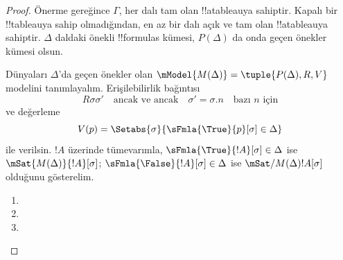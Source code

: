 \documentclass[../../../include/open-logic-section]{subfiles}
\begin{document}
\begin{proof}
Önerme gereğince $\Gamma$, her dalı tam olan !!a{tableau}{}ya sahiptir. Kapalı
bir !!{tableau}{}ya sahip olmadığından, en az bir dalı açık ve tam olan
!!a{tableau}{}ya sahiptir. $\Delta$ daldaki önekli !!{formula}s kümesi,
$P(\Delta)$ da onda geçen önekler kümesi olsun.

Dünyaları $\Delta$'da geçen önekler olan
$\mModel{M(\Delta)} = \tuple{P(\Delta), R, V}$ modelini tanımlayalım.
Erişilebilirlik bağıntısı
\[
R\sigma\sigma' \quad \text{ancak ve ancak} \quad
\sigma'=\sigma.n \quad \text{bazı $n$ için}
\]
ve değerleme
\[
V(p) = \Setabs{\sigma}{\sFmla{\True}{p}[\sigma] \in \Delta}
\]
ile verilsin. $!A$ üzerinde tümevarımla,
$\sFmla{\True}{!A}[\sigma] \in \Delta$ ise
$\mSat{M(\Delta)}{!A}[\sigma]$; $\sFmla{\False}{!A}[\sigma] \in \Delta$
ise $\mSat/{M(\Delta)}{!A}[\sigma]$ olduğunu gösterelim.

\begin{enumerate}
  \item {}
  \item {}
  \item {}
\end{enumerate}
\end{proof}
\end{document}
